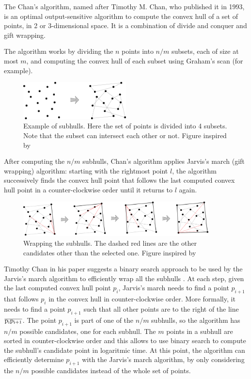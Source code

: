 \documentclass{article}
\begin{document}
The Chan's algorithm, named after Timothy M. Chan, who published it in 1993, is an optimal output-sensitive algorithm to compute the convex hull of a set of points, in 2 or 3-dimensional space. It is a combination of divide and conquer and gift wrapping.

The algorithm works by dividing the $n$ points into $n/m$ subsets, each of size at most $m$, and computing the convex hull of each subset using Graham's scan (for example).

\begin{figure}[h]
\centering
\includegraphics[width=0.5\textwidth]{chan/chan_visual_subhulls.png}
\caption{\label{fig:chan_visual_subhulls}Example of subhulls. Here the set of points is divided into 4 subsets. Note that the subset can intersect each other or not. Figure inspired by \cite{jeffe}}
\end{figure}

After computing the $n/m$ subhulls, Chan's algorithm applies Jarvis's march (gift wrapping) algorithm: starting with the rightmost point $l$, the algorithm successively finds the convex hull point that follows the last computed convex hull point in a counter-clockwise order until it returns to $l$ again.

\begin{figure}[h]
\centering
\includegraphics[width=0.9\textwidth]{chan/chan_visual_wrapping.png}
\caption{\label{fig:chan_visual_wrapping}Wrapping the subhulls. The dashed red lines are the other candidates other than the selected one. Figure inspired by \cite{jeffe}}
\end{figure}

Timothy Chan in his paper suggests a binary search approach to be used by the Jarvis's march algorithm to efficiently wrap all the subhulls \cite{chan}. At each step, given the last computed convex hull point $p_i$, Jarvis's march needs to find a point $p_{i+1}$ that follows $p_i$ in the convex hull in counter-clockwise order. More formally, it needs to find a point $p_{i+1}$ such that all other points are to the right of the line $\overline{\rm p_{i}p_{i+1}}$. The point $p_{i+1}$ is part of one of the $n/m$ subhulls, so the algorithm has $n/m$ possible candidates, one for each subhull. The $m$ points in a subhull are sorted in counter-clockwise order and this allows to use binary search to compute the subhull's candidate point in logaritmic time. At this point, the algorithm can efficiently determine $p_{i+1}$ with the Jarvis's march algorithm, by only considering the $n/m$ possible candidates instead of the whole set of points.
\end{document}
